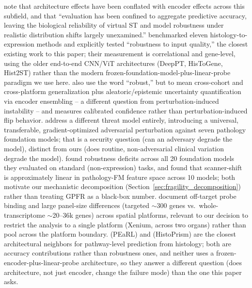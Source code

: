 \documentclass[11pt]{article}
\begin{document}
\citet{stpbench_2026} note that architecture effects have been conflated with encoder effects across this subfield, and that ``evaluation has been confined to aggregate predictive accuracy, leaving the biological reliability of virtual ST and model robustness under realistic distribution shifts largely unexamined.'' \citet{wang2025_translational} benchmarked eleven histology-to-expression methods and explicitly tested ``robustness to input quality,'' the closest existing work to this paper; their measurement is correlational and gene-level, using the older end-to-end CNN/ViT architectures (DeepPT, HisToGene, Hist2ST) rather than the modern frozen-foundation-model-plus-linear-probe paradigm we use here. \citet{stimage_2026} also use the word ``robust,'' but to mean cross-cohort and cross-platform generalization plus aleatoric/epistemic uncertainty quantification via encoder ensembling -- a different question from perturbation-induced instability -- and \citet{utopia_2026} measures calibrated confidence rather than perturbation-induced flip behavior. \citet{utap_2026} address a different threat model entirely, introducing a universal, transferable, gradient-optimized adversarial perturbation against seven pathology foundation models; that is a security question (can an adversary degrade the model), distinct from ours (does routine, non-adversarial clinical variation degrade the model). \citet{pathorob_2026} found robustness deficits across all 20 foundation models they evaluated on standard (non-expression) tasks, and \citet{robustifying_fms_2607} found that scanner-shift is approximately linear in pathology-FM feature space across 10 models; both motivate our mechanistic decomposition (Section~\ref{sec:fragility_decomposition}) rather than treating GPFR as a black-box number. \citet{crossplatform_st_het} document off-target probe binding and large panel-size differences (targeted $\sim$300 genes vs.\ whole-transcriptome $\sim$20--36k genes) across spatial platforms, relevant to our decision to restrict the analysis to a single platform (Xenium, across two organs) rather than pool across the platform boundary. \citet{pearl_2510} (PEaRL) and \citet{histoprism_2026} (HistoPrism) are the closest architectural neighbors for pathway-level prediction from histology; both are accuracy contributions rather than robustness ones, and neither uses a frozen-encoder-plus-linear-probe architecture, so they answer a different question (does architecture, not just encoder, change the failure mode) than the one this paper asks.
\end{document}
